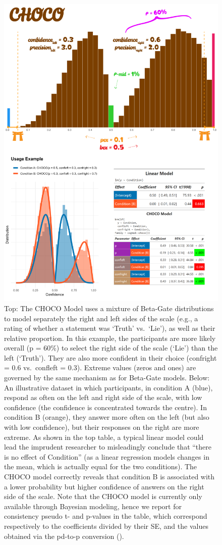 \documentclass[
  jou,
  floatsintext,
  longtable,
  nolmodern,
  notxfonts,
  notimes,
  colorlinks=true,linkcolor=blue,citecolor=blue,urlcolor=blue]{apa7}
\begin{document}
\begin{figure}[!htbp]

{\caption{{Top: The CHOCO Model uses a mixture of Beta-Gate
distributions to model separately the right and left sides of the scale
(e.g., a rating of whether a statement was `Truth' vs.~`Lie'), as well
as their relative proportion. In this example, the participants are more
likely overall (p = 60\%) to select the right side of the scale (`Lie')
than the left (`Truth'). They are also more confident in their choice
(confright = 0.6 vs.~confleft = 0.3). Extreme values (zeros and ones)
are governed by the same mechanism as for Beta-Gate models. Below: An
illustrative dataset in which participants, in condition A (blue),
respond as often on the left and right side of the scale, with low
confidence (the confidence is concentrated towards the centre). In
condition B (orange), they answer more often on the left (but also with
low confidence), but their responses on the right are more extreme. As
shown in the top table, a typical linear model could lead the imprudent
researcher to misleadingly conclude that ``there is no effect of
Condition'' (as a linear regression models changes in the mean, which is
actually equal for the two conditions). The CHOCO model correctly
reveals that condition B is associated with a lower probability but
higher confidence of answers on the right side of the scale. Note that
the CHOCO model is currently only available through Bayesian modeling,
hence we report for consistency pseudo t- and p-values in the table,
which correspond respectively to the coefficients divided by their SE,
and the values obtained via the pd-to-p conversion
().}{\label{fig-two}}}}

\begin{center}
\includegraphics[width=0.7\linewidth,height=\textheight,keepaspectratio]{./figures/fig2final.png}
\end{center}

\end{figure}
\end{document}
